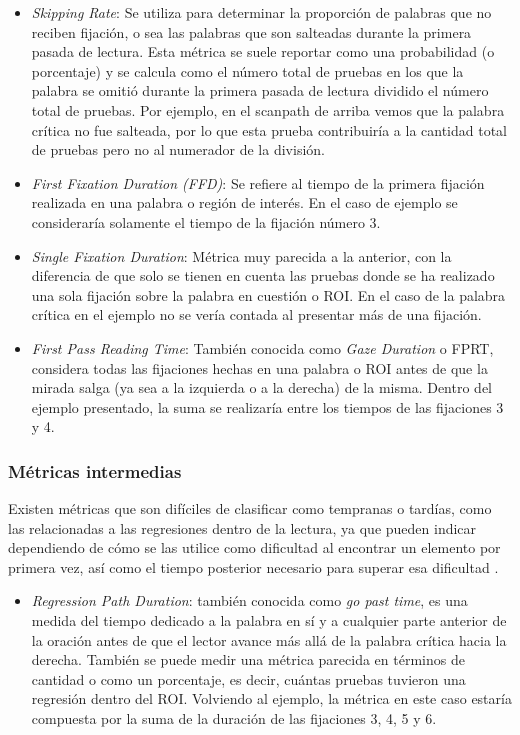 \begin{itemize}
    \item \textit{Skipping Rate}: Se utiliza para determinar la proporción de palabras que no reciben fijación, o sea las palabras que son salteadas durante la primera pasada de lectura. Esta métrica se suele reportar como una probabilidad (o porcentaje) y se calcula como el número total de pruebas en los que la palabra se omitió durante la primera pasada de lectura dividido el número total de pruebas. Por ejemplo, en el scanpath de arriba vemos que la palabra crítica no fue salteada, por lo que esta prueba contribuiría a la cantidad total de pruebas pero no al numerador de la división.
    \item \textit{First Fixation Duration (FFD)}: Se refiere al tiempo de la primera fijación realizada en una palabra o región de interés. En el caso de ejemplo se consideraría solamente el tiempo de la fijación número 3.
    \item \textit{Single Fixation Duration}: Métrica muy parecida a la anterior, con la diferencia de que solo se tienen en cuenta las pruebas donde se ha realizado una sola fijación sobre la palabra en cuestión o ROI. En el caso de la palabra crítica en el ejemplo no se vería contada al presentar más de una fijación.
    \item \textit{First Pass Reading Time}: También conocida como \textit{Gaze Duration} o FPRT, considera todas las fijaciones hechas en una palabra o ROI antes de que la mirada salga (ya sea a la izquierda o a la derecha) de la misma. Dentro del ejemplo presentado, la suma se realizaría entre los tiempos de las fijaciones 3 y 4.
\end{itemize}

\subsubsection{Métricas intermedias}

Existen métricas que son difíciles de clasificar como tempranas o tardías, como las relacionadas a las regresiones dentro de la lectura, ya que pueden indicar dependiendo de cómo se las utilice como dificultad al encontrar un elemento por primera vez, así como el tiempo posterior necesario para superar esa dificultad \parencite{CliftonStaubRayner2007}.

\begin{itemize}
    \item \textit{Regression Path Duration}: también conocida como \textit{go past time}, es una medida del tiempo dedicado a la palabra en sí y a cualquier parte anterior de la oración antes de que el lector avance más allá de la palabra crítica hacia la derecha. También se puede medir una métrica parecida en términos de cantidad o como un porcentaje, es decir, cuántas pruebas tuvieron una regresión dentro del ROI. Volviendo al ejemplo, la métrica en este caso estaría compuesta por la suma de la duración de las fijaciones 3, 4, 5 y 6.
\end{itemize}

